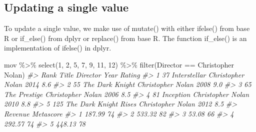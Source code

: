\documentclass[
]{book}
\newenvironment{Shaded}{\begin{snugshade}}{\end{snugshade}}
\newcommand{\CommentTok}[1]{\textcolor[rgb]{0.56,0.35,0.01}{\textit{#1}}}
\newcommand{\DecValTok}[1]{\textcolor[rgb]{0.00,0.00,0.81}{#1}}
\newcommand{\FunctionTok}[1]{\textcolor[rgb]{0.00,0.00,0.00}{#1}}
\newcommand{\NormalTok}[1]{#1}
\newcommand{\SpecialCharTok}[1]{\textcolor[rgb]{0.00,0.00,0.00}{#1}}
\newcommand{\StringTok}[1]{\textcolor[rgb]{0.31,0.60,0.02}{#1}}
\begin{document}
\hypertarget{updating-a-single-value-1}{%
\subsection{Updating a single value}\label{updating-a-single-value-1}}

To update a single value, we make use of mutate() with either ifelse() from base R or if\_else() from dplyr or replace() from base R. The function if\_else() is an implementation of ifelse() in dplyr.

\begin{Shaded}
\begin{Highlighting}[]
\NormalTok{mov }\SpecialCharTok{\%\textgreater{}\%}
  \FunctionTok{select}\NormalTok{(}\DecValTok{1}\NormalTok{, }\DecValTok{2}\NormalTok{, }\DecValTok{5}\NormalTok{, }\DecValTok{7}\NormalTok{, }\DecValTok{9}\NormalTok{, }\DecValTok{11}\NormalTok{, }\DecValTok{12}\NormalTok{) }\SpecialCharTok{\%\textgreater{}\%}
  \FunctionTok{filter}\NormalTok{(Director }\SpecialCharTok{==} \StringTok{\textquotesingle{}Christopher Nolan\textquotesingle{}}\NormalTok{)}
\CommentTok{\#\textgreater{}   Rank                 Title          Director Year Rating}
\CommentTok{\#\textgreater{} 1   37          Interstellar Christopher Nolan 2014    8.6}
\CommentTok{\#\textgreater{} 2   55       The Dark Knight Christopher Nolan 2008    9.0}
\CommentTok{\#\textgreater{} 3   65          The Prestige Christopher Nolan 2006    8.5}
\CommentTok{\#\textgreater{} 4   81             Inception Christopher Nolan 2010    8.8}
\CommentTok{\#\textgreater{} 5  125 The Dark Knight Rises Christopher Nolan 2012    8.5}
\CommentTok{\#\textgreater{}   Revenue Metascore}
\CommentTok{\#\textgreater{} 1  187.99        74}
\CommentTok{\#\textgreater{} 2  533.32        82}
\CommentTok{\#\textgreater{} 3   53.08        66}
\CommentTok{\#\textgreater{} 4  292.57        74}
\CommentTok{\#\textgreater{} 5  448.13        78}


\end{Highlighting}
\end{Shaded}
\end{document}
